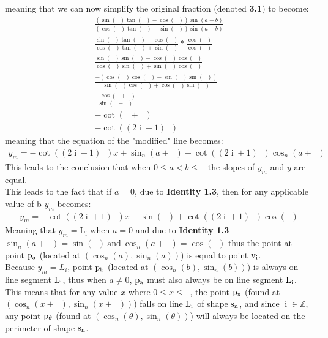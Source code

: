 \documentclass[11pt]{article}
\DeclareMathOperator{\custi}{\mathrm{i}}
\DeclareMathOperator{\period}{\frac{2\pi}{n}}
\DeclareMathOperator{\hp}{\frac{\pi}{n}}
\DeclareMathOperator{\iperiod}{\custi\frac{2\pi}{n}}
\begin{document}
meaning that we can now simplify the original fraction (denoted \textbf{3.1}) to become:
\begin{gather*}
\frac{(\sin(\iperiod)\tan(\hp)-\cos(\iperiod))\sin(a-b)}{(\cos(\iperiod)\tan(\hp)+\sin(\iperiod))\sin(a-b)}\\
\frac{\sin(\iperiod)\tan(\hp)-\cos(\iperiod)}{\cos(\iperiod)\tan(\hp)+\sin(\iperiod)} * \frac{\cos(\hp)}{\cos(\hp)}\\
\frac{\sin(\iperiod)\sin(\hp)-\cos(\iperiod)\cos(\hp)}{\cos(\iperiod)\sin(\hp)+\sin(\iperiod)\cos(\hp)}\\
\frac{-(\cos(\iperiod)\cos(\hp)-\sin(\iperiod)\sin(\hp))}{\sin(\hp)\cos(\iperiod)+\cos(\hp)\sin(\iperiod)}\\
\frac{-\cos(\iperiod+\hp)}{\sin(\iperiod+\hp)}\\
-\cot(\iperiod+\hp)\\
-\cot((2\custi+1)\hp)
\end{gather*}
meaning that the equation of the "modified" line becomes:
\begin{gather*}
y_m=-\cot((2\custi+1)\hp)x+\sin_n(a+\iperiod)+\cot((2\custi+1)\hp)\cos_n(a+\iperiod)
\end{gather*}
This leads to the conclusion that when \(0\leq a<b\leq\period\) the slopes of \(y_m\) and \(y\) are equal. \\
This leads to the fact that if \(a=0\), due to \textbf{Identity 1.3}, then for any applicable value of b \(y_m\) becomes:
\begin{gather*}
y_m=-\cot((2\custi+1)\hp)x+\sin(\iperiod)+\cot((2\custi+1)\hp)\cos(\iperiod)
\end{gather*}
Meaning that \(y_m=\mathrm{L_i}\) when \(a=0\) and due to \textbf{Identity 1.3} \(\sin_n(a+\iperiod)=\sin(\iperiod) \mathrm{\ and\ } \cos_n(a+\iperiod)=\cos(\iperiod)\) thus the point at point \(\rm p_a\) (located at \((\cos_n(a), \sin_n(a))\)) is equal to point \(\rm v_i\).\\
Because \(y_m = L_i\), point \(\rm p_b\) (located at \((\cos_n(b),\sin_n(b))\)) is always on line segment \(\rm L_i\), thus when \(a\neq0\), \(\rm p_a\) must also always be on line segment \(\rm L_i\).\\
This means that for any value \(x\) where \(0\leq x \leq\period\), the point \(\rm p_x\) (found at \((\cos_n(x+\iperiod),\sin_n(x+\iperiod))\)) falls on line \(\rm L_i\) of shape \(\rm s_n\), and since \(\custi\in\mathbb{Z}\), any point \(\rm p_\theta\) (found at \((\cos_n(\theta),\sin_n(\theta))\)) will always be located on the perimeter of shape \(\rm s_n\).
\end{document}
